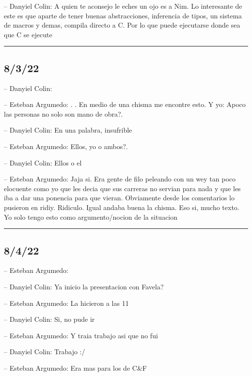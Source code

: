 -- Danyiel Colin: A quien te aconsejo le eches un ojo es a Nim. Lo
interesante de este es que aparte de tener buenas abstracciones,
inferencia de tipos, un sistema de macros y demas, compila directo a C.
Por lo que puede ejecutarse donde sea que C se ejecute

\begin{center}\rule{0.5\linewidth}{0.5pt}\end{center}

\hypertarget{section-139}{%
\subsection{8/3/22}\label{section-139}}

-- Danyiel Colin:

-- Esteban Argumedo: . . En medio de una chisma me encontre esto. Y yo:
Apoco las personas no solo son mano de obra?.

-- Danyiel Colin: En una palabra, insufrible

-- Esteban Argumedo: Ellos, yo o ambos?.

-- Danyiel Colin: Ellos o el

-- Esteban Argumedo: Jaja si. Era gente de filo peleando con un wey tan
poco elocuente como yo que les decia que sus carreras no servian para
nada y que les iba a dar una ponencia para que vieran. Obviamente desde
los comentarios lo pusieron en ridiy. Ridiculo. Igual andaba buena la
chisma. Eso si, mucho texto. Yo solo tengo esto como argumento/nocion de
la situacion

\begin{center}\rule{0.5\linewidth}{0.5pt}\end{center}

\hypertarget{section-140}{%
\subsection{8/4/22}\label{section-140}}

-- Esteban Argumedo:

-- Danyiel Colin: Ya inicio la presentacion con Favela?

-- Esteban Argumedo: La hicieron a las 11

-- Danyiel Colin: Si, no pude ir

-- Esteban Argumedo: Y traia trabajo asi que no fui

-- Danyiel Colin: Trabajo :/

-- Esteban Argumedo: Era mas para los de C\&F

